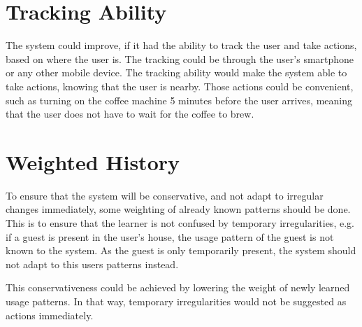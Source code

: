 \section{Tracking Ability}
The system could improve, if it had the ability to track the user and take actions, based on where the user is. The tracking could be through the user's smartphone or any other mobile device. The tracking ability would make the system able to take actions, knowing that the user is nearby. Those actions could be  convenient, such as turning on the coffee machine 5 minutes before the user arrives, meaning that the user does not have to wait for the coffee to brew.

\section{Weighted History}
To ensure that the system will be conservative, and not adapt to irregular changes immediately, some weighting of already known patterns should be done. This is to ensure that the learner is not confused by temporary irregularities, e.g. if a guest is present in the user's house, the usage pattern of the guest is not known to the system. As the guest is only temporarily present, the system should not adapt to this users patterns instead.

This conservativeness could be achieved by lowering the weight of newly learned usage patterns. In that way, temporary irregularities would not be suggested as actions immediately.
